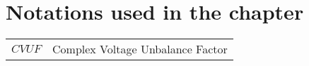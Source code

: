 \newpage
\section*{Notations used in the chapter}

\begin{scriptsize}
\begin{tabularx}{\textwidth}{r|X}
%
%
%
$CVUF$  													& Complex Voltage Unbalance Factor\\
%
%

\end{tabularx}
\end{scriptsize}
